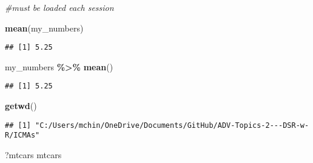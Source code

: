 \documentclass[
]{article}
\newenvironment{Shaded}{\begin{snugshade}}{\end{snugshade}}
\newcommand{\CommentTok}[1]{\textcolor[rgb]{0.56,0.35,0.01}{\textit{#1}}}
\newcommand{\FunctionTok}[1]{\textcolor[rgb]{0.13,0.29,0.53}{\textbf{#1}}}
\newcommand{\NormalTok}[1]{#1}
\newcommand{\SpecialCharTok}[1]{\textcolor[rgb]{0.81,0.36,0.00}{\textbf{#1}}}
\begin{document}
\begin{Shaded}
\begin{Highlighting}[]
\CommentTok{\#must be loaded each session}
\end{Highlighting}
\end{Shaded}

\begin{Shaded}
\begin{Highlighting}[]
\FunctionTok{mean}\NormalTok{(my\_numbers)}
\end{Highlighting}
\end{Shaded}

\begin{verbatim}
## [1] 5.25
\end{verbatim}

\begin{Shaded}
\begin{Highlighting}[]
\NormalTok{my\_numbers }\SpecialCharTok{\%\textgreater{}\%} 
  \FunctionTok{mean}\NormalTok{()}
\end{Highlighting}
\end{Shaded}

\begin{verbatim}
## [1] 5.25
\end{verbatim}

\begin{Shaded}
\begin{Highlighting}[]
\FunctionTok{getwd}\NormalTok{()}
\end{Highlighting}
\end{Shaded}

\begin{verbatim}
## [1] "C:/Users/mchin/OneDrive/Documents/GitHub/ADV-Topics-2---DSR-w-R/ICMAs"
\end{verbatim}

\begin{Shaded}
\begin{Highlighting}[]
\NormalTok{?mtcars}
\NormalTok{mtcars}
\end{Highlighting}
\end{Shaded}
\end{document}
